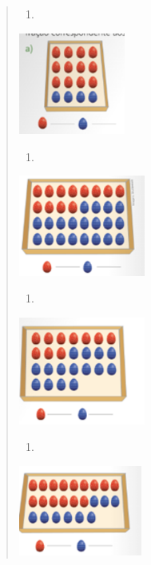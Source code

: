 \begin{mdframed}[linewidth=2pt,linecolor=salmao,roundcorner=2pt]
\begin{itemize}
{\begin{itemize}
\begin{escolha}
{\begin{quote}
{\begin{escolha}
{{{{%

\begin{enumerate}
\item
\end{enumerate}

\includegraphics[width=1.37512in,height=1.31678in]{media/image118.png}

\begin{enumerate}
\item
\end{enumerate}

\includegraphics[width=1.64181in,height=1.30845in]{media/image119.png}

\begin{enumerate}
\item
\end{enumerate}

\includegraphics[width=1.63347in,height=1.39179in]{media/image120.png}

\begin{enumerate}
\item
\end{enumerate}

\includegraphics[width=1.60014in,height=1.16677in]{media/image121.png}

}}}}
\end{escolha}}
\end{quote}}
\end{escolha}
\end{itemize}}
\end{itemize}
\end{mdframed}

